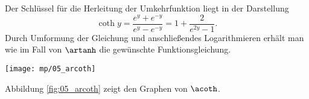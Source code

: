 \begin{antwort}
  Der Schlüssel für die Herleitung der Umkehrfunktion liegt in der 
  Darstellung 
  \[
  \coth y = \frac{e^y+e^{-y}}{e^y-e^{-y}} = 1+\frac{2}{e^{2y}-1}.
  \]
  Durch Umformung der Gleichung und anschließendes Logarithmieren 
  erhält man wie im Fall von $\artanh$ die gewünschte Funktionsgleichung. 

  \begin{center}
    \texttt{[image: mp/05\_arcoth]}
    \label{fig:05_arcoth}
  \end{center}

  Abbildung \ref{fig:05_arcoth} zeigt den Graphen von $\acoth$.
  \AntEnd
\end{antwort}


























